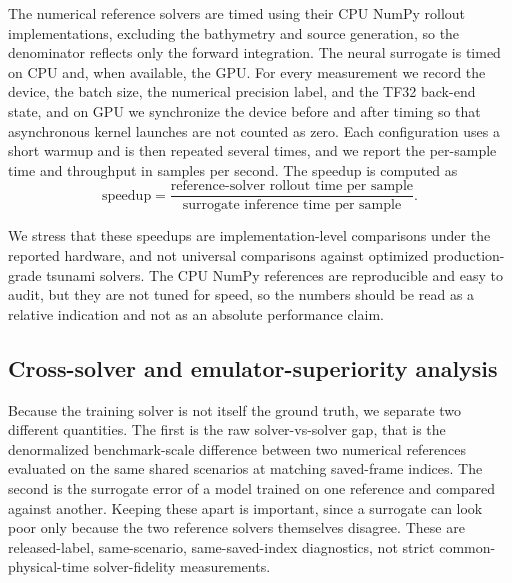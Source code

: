 The numerical reference solvers are timed using their CPU NumPy rollout implementations, excluding the bathymetry and source generation, so the denominator reflects only the forward integration. The neural surrogate is timed on CPU and, when available, the GPU. For every measurement we record the device, the batch size, the numerical precision label, and the TF32 back-end state, and on GPU we synchronize the device before and after timing so that asynchronous kernel launches are not counted as zero. Each configuration uses a short warmup and is then repeated several times, and we report the per-sample time and throughput in samples per second. The speedup is computed as
\[
\mathrm{speedup} =
\frac{\text{reference-solver rollout time per sample}}
    {\text{surrogate inference time per sample}}.
\]

We stress that these speedups are implementation-level comparisons under the reported hardware, and not universal comparisons against optimized production-grade tsunami solvers. The CPU NumPy references are reproducible and easy to audit, but they are not tuned for speed, so the numbers should be read as a relative indication and not as an absolute performance claim.

\subsection{Cross-solver and emulator-superiority analysis}
\label{subsec:cross-solver}

Because the training solver is not itself the ground truth, we separate two different quantities. The first is the raw solver-vs-solver gap, that is the denormalized benchmark-scale difference between two numerical references evaluated on the same shared scenarios at matching saved-frame indices. The second is the surrogate error of a model trained on one reference and compared against another. Keeping these apart is important, since a surrogate can look poor only because the two reference solvers themselves disagree. These are released-label, same-scenario, same-saved-index diagnostics, not strict common-physical-time solver-fidelity measurements.

